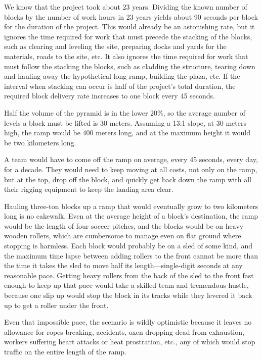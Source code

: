 \documentclass[letterpaper,11pt]{article}
\begin{document}
We know that the project took about 23 years. 
Dividing the known number of blocks by the number of work hours in 23 years yields about 90 seconds per block for the duration of the project. 
This would already be an astonishing rate, but it ignores the time required for work that must precede the stacking of the blocks, such 
as clearing and leveling the site, preparing docks and yards for the materials, roads to the site, etc. 
It also ignores the time required for work that must follow the stacking the blocks, such as cladding the structure, tearing down 
and hauling away the hypothetical long ramp, building the plaza, etc.  
If the interval when stacking can occur is half of the project's total duration, the required block delivery rate 
increases to one block every 45 seconds.

Half the volume of the pyramid is in the lower 20\%, so the average number of levels a block must be lifted is 30 meters.
Assuming a 13:1 slope, at 30 meters high, the ramp would be 400 meters long, and at the maximum height it would 
be two kilometers long.

A team would have to come off the ramp on average, every 45 seconds, every day, for a decade. 
They would need to keep moving at all costs, not only on the ramp, but at the top, drop off the block, and quickly get back down 
the ramp with all their rigging equipment to keep the landing area clear.

Hauling three-ton blocks up a ramp that would eventually grow to two kilometers long is no cakewalk.  
Even at the average height of a block's destination, the ramp would be the length of four soccer pitches, and the blocks
would be on heavy wooden rollers, which are cumbersome to manage even on flat ground where stopping is harmless.
Each block would probably be on a sled of some kind, and the maximum time lapse between adding rollers to the front 
cannot be more than the time it takes the sled to move half its length---single-digit seconds at any 
reasonable pace. 
Getting heavy rollers from the back of the sled to the front fast enough to keep up that pace would take a skilled team 
and tremendous hustle, because one slip up would stop the block in its tracks while they levered it back up to get a 
roller under the front.

Even that impossible pace, the scenario is wildly optimistic because it leaves no allowance for ropes breaking, accidents, 
oxen dropping dead from exhaustion, workers suffering heart attacks or heat prostration, etc., any of which would stop 
traffic on the entire length of the ramp. 
\end{document}
